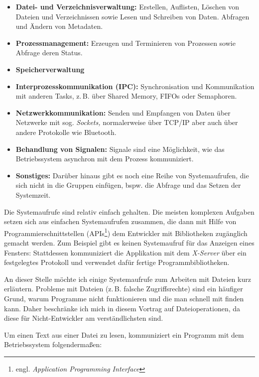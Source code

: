 \begin{itemize}
  \item \textbf{Datei- und Verzeichnisverwaltung:} Erstellen, Auflisten, Löschen von Dateien und 
    Verzeichnissen sowie Lesen und Schreiben von Daten. Abfragen und Ändern von Metadaten.
  \item \textbf{Prozessmanagement:} Erzeugen und Terminieren von Prozessen sowie Abfrage deren 
   Status.
  \item \textbf{Speicherverwaltung}
  \item \textbf{Interprozesskommunikation (IPC):} Synchronisation und Kommunikation mit anderen
    Tasks, z.\,B. über Shared Memory, FIFOs oder Semaphoren.
  \item \textbf{Netzwerkkommunikation:} Senden und Empfangen von Daten über Netzwerke mit sog.
   \emph{Sockets,} normalerweise über TCP/IP aber auch über andere Protokolle wie Bluetooth.
  \item \textbf{Behandlung von Signalen:} Signale sind eine Möglichkeit, wie das Betriebssystem
    asynchron mit dem Prozess kommuniziert.
  \item \textbf{Sonstiges:} Darüber hinaus gibt es noch eine Reihe von Systemaufrufen, die sich
    nicht in die Gruppen einfügen, bspw. die Abfrage und das Setzen der Systemzeit.
\end{itemize}

Die Systemaufrufe sind relativ einfach gehalten. Die meisten komplexen Aufgaben setzen sich aus
einfachen Systemaufrufen zusammen, die dann mit Hilfe von Programmierschnittstellen (APIs\footnote{
engl. \emph{Application Programming Interface}}) dem Entwickler mit Bibliotheken zugänglich gemacht
werden. Zum Beispiel gibt es keinen Systemaufruf für das Anzeigen eines Fensters: Stattdessen
kommuniziert die Applikation mit dem \emph{X-Server} über ein festgelegtes Protokoll und verwendet
dafür fertige Programmbibliotheken.


An dieser Stelle möchte ich einige Systemaufrufe zum Arbeiten mit Dateien kurz erläutern. Probleme
mit Dateien (z.\,B. falsche Zugriffsrechte) sind ein häufiger Grund, warum Programme nicht
funktionieren und die man schnell mit \strace{} finden kann. Daher beschränke ich mich in diesem
Vortrag auf Dateioperationen, da diese für Nicht-Entwickler am verständlichsten sind.

Um einen Text aus einer Datei zu lesen, kommuniziert ein Programm mit dem Betriebssystem
folgendermaßen:

